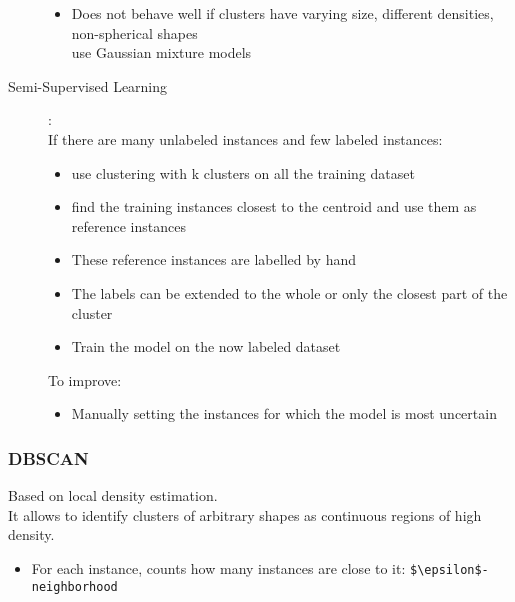 \begin{description}
\begin{itemize}
            \item Does not behave well if clusters have varying size, different densities, non-spherical shapes\\
                \arrow use Gaussian mixture models
        \end{itemize}
    \item[Semi-Supervised Learning]: \hfill\\
        If there are many unlabeled instances and few labeled instances:\\
        \begin{itemize}
            \item use clustering with k clusters on all the training dataset
            \item find the training instances closest to the centroid and use them as reference instances
            \item These reference instances are labelled by hand
            \item The labels can be extended to the whole or only the closest part of the cluster
            \item Train the model on the now labeled dataset
        \end{itemize}
        To improve:
        \begin{itemize}
            \item Manually setting the instances for which the model is most uncertain
        \end{itemize}
\end{description}

\subsubsection{DBSCAN}

Based on local density estimation.\\
It allows to identify clusters of arbitrary shapes as continuous regions of high density.
\begin{itemize}
    \item For each instance, counts how many instances are close to it: \verb;$\epsilon$-neighborhood;
\end{itemize}
